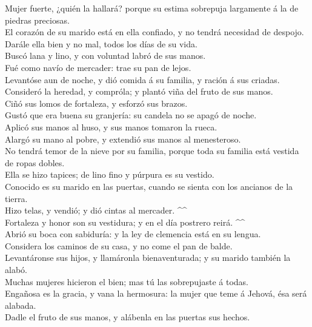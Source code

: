  Mujer fuerte, ¿quién la hallará? porque su estima
sobrepuja largamente á la de piedras preciosas.\\
 El corazón de su marido está en ella confiado, y no tendrá
necesidad de despojo.\\
 Darále ella bien y no mal, todos los días de su vida.\\
 Buscó lana y lino, y con voluntad labró de sus manos.\\
 Fué como navío de mercader: trae su pan de lejos.\\
 Levantóse aun de noche, y dió comida á su familia, y
ración á sus criadas.\\
 Consideró la heredad, y compróla; y plantó viña del fruto
de sus manos.\\
 Ciñó sus lomos de fortaleza, y esforzó sus brazos.\\
 Gustó que era buena su granjería: su candela no se apagó
de noche.\\
 Aplicó sus manos al huso, y sus manos tomaron la rueca.\\
 Alargó su mano al pobre, y extendió sus manos al
menesteroso.\\
 No tendrá temor de la nieve por su familia, porque toda su
familia está vestida de ropas dobles.\\
 Ella se hizo tapices; de lino fino y púrpura es su
vestido.\\
 Conocido es su marido en las puertas, cuando se sienta con
los ancianos de la tierra.\\
 Hizo telas, y vendió; y dió cintas al mercader. \^{}\^{}\\
 Fortaleza y honor son su vestidura; y en el día postrero
reirá. \^{}\^{}\\
 Abrió su boca con sabiduría: y la ley de clemencia está en
su lengua.\\
 Considera los caminos de su casa, y no come el pan de
balde.\\
 Levantáronse sus hijos, y llamáronla bienaventurada; y su
marido también la alabó.\\
 Muchas mujeres hicieron el bien; mas tú las sobrepujaste á
todas.\\
 Engañosa es la gracia, y vana la hermosura: la mujer que
teme á Jehová, ésa será alabada.\\
 Dadle el fruto de sus manos, y alábenla en las puertas sus
hechos.
